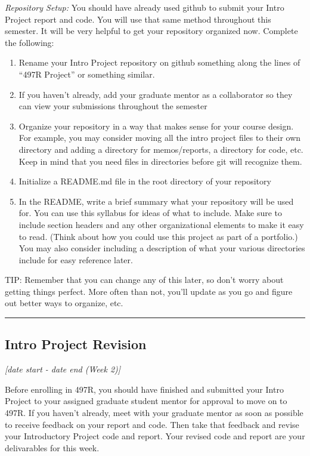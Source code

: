 \documentclass[12pt]{article}
\begin{document}
\textit{Repository Setup:} You should have already used github to submit your Intro Project report and code. You will use that same method throughout this semester.
It will be very helpful to get your repository organized now.
Complete the following:

\begin{enumerate}
	\item Rename your Intro Project repository on github something along the lines of ``497R Project'' or something similar.
	\item If you haven't already, add your graduate mentor as a collaborator so they can view your submissions throughout the semester
	\item Organize your repository in a way that makes sense for your course design. For example, you may consider moving all the intro project files to their own directory and adding a directory for memos/reports, a directory for code, etc.  Keep in mind that you need files in directories before git will recognize them.
	\item Initialize a README.md file in the root directory of your repository
	\item In the README, write a brief summary what your repository will be used for.  You can use this syllabus for ideas of what to include.  Make sure to include section headers and any other organizational elements to make it easy to read. (Think about how you could use this project as part of a portfolio.) You may also consider including a description of what your various directories include for easy reference later.
\end{enumerate}

\noindent TIP:  Remember that you can change any of this later, so don't worry about getting things perfect.  More often than not, you'll update as you go and figure out better ways to organize, etc.



\vspace{1em}\hrule\vspace{1em}
\subsection{Intro Project Revision}
\label{ssec:ipr}

\textit{[date start - date end (Week 2)]}
 
\bigskip
 
Before enrolling in 497R, you should have finished and submitted your Intro Project to your assigned graduate student mentor for approval to move on to 497R.
If you haven't already, meet with your graduate mentor as soon as possible to receive feedback on your report and code.  Then take that feedback and revise your Introductory Project code and report.  Your revised code and report are your delivarables for this week.
\end{document}
